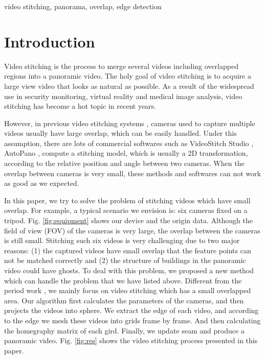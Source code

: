 \documentclass[conference]{IEEEtran}
\begin{document}
\begin{IEEEkeywords}
video stitching, panorama, overlap, edge detection
\end{IEEEkeywords}

\section{Introduction}
\label{sec:intro}

Video stitching is the process to merge several videos
including overlapped regions into a panoramic video. The
holy goal of video stitching is to acquire a large view video
that looks as natural as possible. As a result of the widespread
use in security monitoring, virtual reality and medical image
analysis, video stitching has become a hot topic in recent years.

However, in previous video stitching systems \cite{zheng2008stitching, guo2016joint, Jiang_2015_CVPR_Workshops, nie2018dynamic},
cameras used to capture multiple videos usually have large overlap, which can be easily handled.
Under this assumption, there are lots of commercial softwares such as VideoStitch Studio \cite{videostitching}, AutoPano \cite{autopano},
compute a stitching model, which is usually a 2D transformation,
according to the relative position and angle between two cameras. 
When the overlap between cameras is very small, these methods and softwares can
not work as good as we expected.

In this paper, we try to solve the problem of stitching videos which have small overlap. 
For example, a typical scenario we envision is: six cameras fixed on 
a tripod. Fig. \ref{fig:equipment} shows our device and the origin data. Although the field of view (FOV) of the cameras is very large, the overlap between the 
cameras is still small. Stitching such six videos is very challenging due to two
major reasons: (1) the captured videos have small overlap that the feature points can not be matched correctly 
and (2) the structure of buildings in the panoramic video could have ghosts.
To deal with this problem, we proposed a new method which can handle the problem that we have listed above.
Different from the period work \cite{Jiang_2015_CVPR_Workshops}, we mainly focus on video stitching which has a small overlapped area.
Our algorithm first calculates the parameters of the cameras, and then projects
the videos into sphere. We extract the edge of each video, and according to the edge we mesh these videos into grids frame by frame.
And then calculating the homegraphy matrix of each gird. Finally, we update seam and produce a panoramic video.
Fig. \ref{fig:res} shows the video stitching process presented in this paper.
\end{document}
